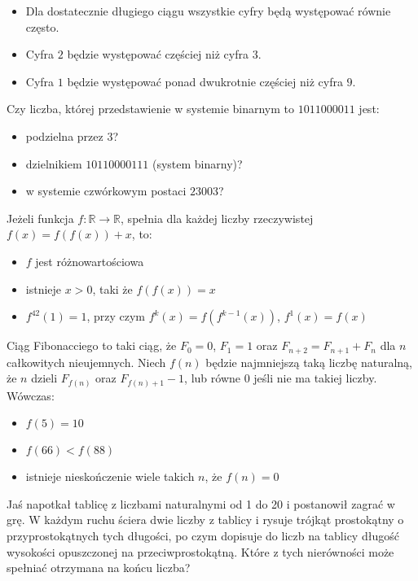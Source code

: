 \documentclass[12pt, a4paper]{article}
\newcommand{\R}{\mathbb{R}}
\newcommand{\question}[1]{\normalitem \begin{samepage}#1 \end{samepage}}
\newcommand{\questionwithasterix}[1]{ \asterixitem \begin{samepage}#1 \vspace{6cm}\end{samepage}}
\newcommand{\cmark}{\textcolor{green}{T}}%
\newcommand{\xmark}{\textcolor{red}{N}}%
\newcommand{\yes}{\rlap{\framebox(15,15)} {\raisebox{2pt}{\large\hspace{-1pt}\cmark}}%
\hspace{3pt}}
\newcommand{\no}{\rlap{\framebox(15,15)} {\raisebox{2pt}{\large\hspace{-1pt}\xmark}}%
\hspace{3pt}}
\begin{document}
\begin{enumerate}
{		\begin{itemize}
			\item [\no]Dla dostatecznie długiego ciągu wszystkie cyfry będą występować równie często.
			\item [\yes]Cyfra $2$ będzie występować częściej niż cyfra $3$.
			\item [\yes]Cyfra $1$ będzie występować ponad dwukrotnie częściej niż cyfra $9$.
		\end{itemize}
	}
	
	\question {
		Czy liczba, której przedstawienie w systemie binarnym to $1011000011$ jest:
	
		\begin{itemize}
			\item [\no]podzielna przez $3$?
			\item [\no]dzielnikiem $10110000111$ (system binarny)?
			\item [\yes]w systemie czwórkowym postaci $23003$?
		\end{itemize}
	}
	
	\question {
		Jeżeli funkcja $f: \R \rightarrow \R$, spełnia dla każdej liczby rzeczywistej $f(x) = f(f(x)) + x$, to:
	
		\begin{itemize}
			\item [\yes]$f$ jest różnowartościowa
			\item [\no]istnieje $x > 0$, taki że $f(f(x)) = x$
			\item [\yes]$f^{42}(1) = 1$, przy czym $f^{k}(x) = f(f^{k-1}(x))$, $f^1(x) = f(x)$
		\end{itemize}
	}
	
	\question {
		Ciąg Fibonacciego to taki ciąg, że $F_0 = 0$, $F_1 = 1$ oraz $F_{n+2} = F_{n+1} + F_n$ dla $n$ całkowitych nieujemnych. Niech $f(n)$ będzie najmniejszą taką liczbę naturalną, że $n$ dzieli $F_{f(n)}$ oraz $F_{f(n)+1}-1$, lub równe 0 jeśli nie ma takiej liczby. Wówczas:
	
		\begin{itemize}
			\item [\no]$f(5) = 10$
			\item [\no]$f(66) < f(88)$
			\item [\no]istnieje nieskończenie wiele takich $n$, że $f(n) = 0$
		\end{itemize}
	}
	
	\questionwithasterix{
		Jaś napotkał tablicę z liczbami naturalnymi od 1 do 20 i postanowił zagrać w grę. W każdym ruchu ściera dwie liczby z tablicy i rysuje trójkąt prostokątny o przyprostokątnych tych długości, po czym dopisuje do liczb na tablicy długość wysokości opuszczonej na przeciwprostokątną. Które z tych nierówności może spełniać otrzymana na końcu liczba?
		
}
\end{enumerate}
\end{document}
